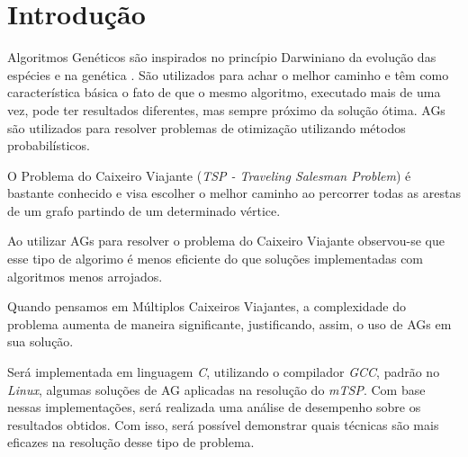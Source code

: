 \documentclass[final,5p,times,twocolumn]{elsarticle}
\begin{document}



\section{Introdução}
		
		Algoritmos Genéticos são inspirados no princípio Darwiniano da evolução das espécies e na genética \cite{0004-pdf}. 
		São utilizados para achar o melhor caminho e têm como característica básica o fato de que o mesmo algoritmo, 
		executado mais de uma vez, pode ter resultados diferentes, mas sempre próximo da solução ótima. AGs são utilizados 
		para resolver problemas de otimização utilizando métodos probabilísticos.
	
		O Problema do Caixeiro Viajante (\textit{TSP - Traveling Salesman Problem}) é bastante conhecido e visa escolher o 
		melhor caminho ao percorrer todas as arestas de um grafo partindo de um determinado vértice.

		
		Ao utilizar AGs para resolver o problema do Caixeiro Viajante observou-se que esse tipo de algorimo é menos eficiente 
		do que soluções implementadas com algoritmos menos arrojados.
		
		Quando pensamos em Múltiplos Caixeiros Viajantes, a complexidade do problema aumenta de maneira significante, justificando, 
		assim, o uso de AGs em sua solução.
		
		
		Será implementada em linguagem \textit{C}, utilizando o compilador \textit{GCC}, padrão no \textit{Linux}, 
		algumas soluções de AG aplicadas na resolução do \textit{mTSP}. Com base nessas implementações, será 
		realizada uma análise de desempenho sobre os resultados obtidos. Com isso, será possível demonstrar quais 
		técnicas são mais eficazes na resolução desse tipo de problema.
		
\end{document}

